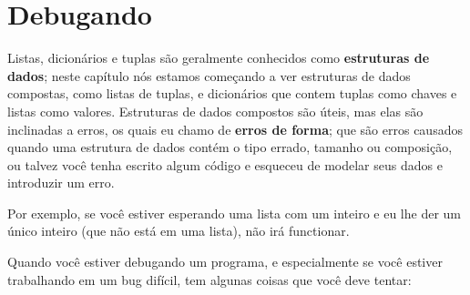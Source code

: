 \section{Debugando}


Listas, dicionários e tuplas são geralmente conhecidos como {\bf estruturas de
dados}; neste capítulo nós estamos começando a ver estruturas de dados
compostas, como listas de tuplas, e dicionários que contem tuplas como chaves
e listas como valores. Estruturas de dados compostos são úteis, mas elas são
inclinadas a erros, os quais eu chamo de {\bf erros de forma}; que são erros
causados quando uma estrutura de dados contém o tipo errado, tamanho ou
composição, ou talvez você tenha escrito algum código e esqueceu de modelar
seus dados e introduzir um erro.

Por exemplo, se você estiver esperando uma lista com um inteiro e eu lhe der
um único inteiro (que não está em uma lista), não irá functionar.

Quando você estiver debugando um programa, e especialmente se você estiver
trabalhando em um bug difícil, tem algunas coisas que você deve tentar:

